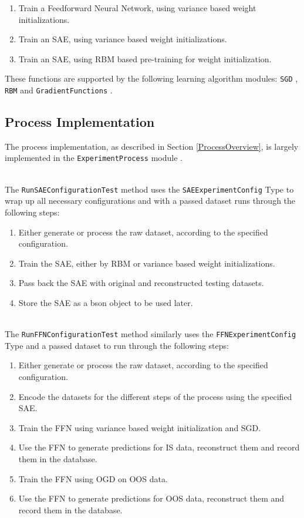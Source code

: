 \documentclass[a4paper,11pt,oneside]{article}
\theoremstyle{plain}
\theoremstyle{definition}
\begin{document}
	\begin{enumerate}
		\item Train a Feedforward Neural Network, using variance based weight initializations.
		\item Train an SAE, using variance based weight initializations.
		\item Train an SAE, using RBM based pre-training for weight initialization.
	\end{enumerate}
	
	These functions are supported by the following learning algorithm modules: \texttt{SGD} \citep{DCSGD}, \texttt{RBM} \citep{DCRBM} and  \texttt{GradientFunctions} \citep{DCGradientFunctions}.
	
	\subsection{Process Implementation}
	
	The process implementation, as described in Section \ref{ProcessOverview}, is largely implemented in the \texttt{ExperimentProcess} module \citep{DCExperimentProcess}.
	
	~\\
	The \texttt{RunSAEConfigurationTest} method uses the \texttt{SAEExperimentConfig} Type to wrap up all necessary configurations and with a passed dataset runs through the following steps:
	\begin{enumerate}
		\item Either generate or process the raw dataset, according to the specified configuration.
		\item Train the SAE, either by RBM or variance based weight initializations.
		\item Pass back the SAE with original and reconstructed testing datasets.
		\item Store the SAE as a bson object to be used later.
	\end{enumerate}
	
	~\\
	The \texttt{RunFFNConfigurationTest} method similarly uses the \texttt{FFNExperimentConfig} Type and a passed dataset to run through the following steps:
	\begin{enumerate}
		\item Either generate or process the raw dataset, according to the specified configuration.
		\item Encode the datasets for the different steps of the process using the specified SAE.
		\item Train the FFN using variance based weight initialization and SGD.
		\item Use the FFN to generate predictions for IS data, reconstruct them and record them in the database.
		\item Train the FFN using OGD on OOS data.
		\item Use the FFN to generate predictions for OOS data, reconstruct them and record them in the database.
	\end{enumerate}
	
\end{document}
